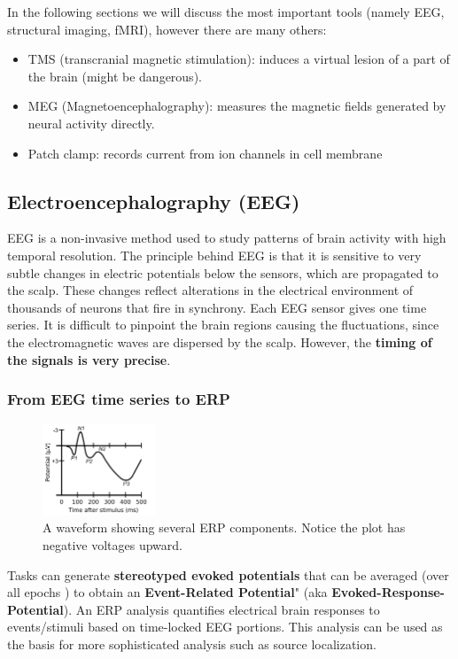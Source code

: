 In the following sections we will discuss the most important tools (namely EEG, structural imaging, fMRI), however there are many others:
\begin{itemize}
    \item TMS (transcranial magnetic stimulation): induces a virtual lesion of a part of the brain (might be dangerous).
    \item MEG (Magnetoencephalography): measures the magnetic fields generated by neural activity directly.
    \item Patch clamp: records current from ion channels in cell membrane
\end{itemize}

\subsection{Electroencephalography (EEG)}
EEG is a non-invasive method used to study patterns of brain activity with high temporal resolution.
The principle behind EEG is that it is sensitive to very subtle changes in electric potentials below the sensors, which are propagated to the scalp. These changes reflect alterations in the electrical environment of thousands of neurons that fire in synchrony. Each EEG sensor gives one time series.
It is difficult to pinpoint the brain regions causing the fluctuations, since the electromagnetic waves are dispersed by the scalp. However, the \textbf{timing of the signals is very precise}.

\subsubsection{From EEG time series to ERP}
\begin{figure}
  \centering \includegraphics[width=0.3\textwidth]{images/ComponentsofERP.png}
  \caption{A waveform showing several ERP components. Notice the plot has negative voltages upward.}
\end{figure}

Tasks can generate \textbf{stereotyped evoked potentials} that can be averaged (over all epochs \notet) to obtain an \textbf{Event-Related Potential}" (aka \textbf{Evoked-Response-Potential}). An ERP analysis quantifies electrical brain responses to events/stimuli based on time-locked EEG portions. This analysis can be used as the basis for more sophisticated analysis such as source localization.

